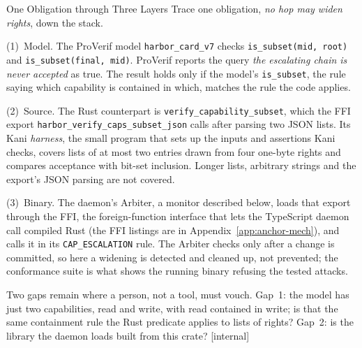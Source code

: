 \documentclass[11pt,a4paper]{article}
\theoremstyle{definition}
\begin{document}
\begin{pdexample}{One Obligation through Three Layers}
\setlength{\parskip}{4pt plus 1pt}
Trace one obligation, \emph{no hop may widen rights}, down the stack.

(1)~Model. The ProVerif model \texttt{harbor\_card\_v7} checks
\texttt{is\_subset(mid, root)} and \texttt{is\_subset(final, mid)}. ProVerif
reports the query \emph{the escalating chain is never accepted} as true. The
result holds only if the model's \texttt{is\_subset}, the rule saying which
capability is contained in which, matches the rule the code applies.

(2)~Source. The Rust counterpart is \texttt{verify\_capability\_subset}, which
the FFI export \texttt{harbor\_verify\_caps\_subset\_json} calls after parsing
two JSON lists. Its Kani \emph{harness}, the small program that sets up the
inputs and assertions Kani checks, covers lists of at most two entries drawn
from four one-byte rights and compares acceptance with bit-set inclusion.
Longer lists, arbitrary strings and the export's JSON parsing are not covered.

(3)~Binary. The daemon's Arbiter, a monitor described below, loads that
export through the FFI, the foreign-function interface that lets the
TypeScript daemon call compiled Rust (the FFI listings are in
Appendix~\ref{app:anchor-mech}), and calls it in its \texttt{CAP\_ESCALATION}
rule. The Arbiter checks only after a change is committed, so here a widening
is detected and cleaned up, not prevented; the conformance suite is what shows
the running binary refusing the tested attacks.

Two gaps remain where a person, not a tool, must vouch. Gap~1: the model has
just two capabilities, read and write, with read contained in write; is that
the same containment rule the Rust predicate applies to lists of rights? Gap~2: is the library
the daemon loads built from this crate? [internal]
\end{pdexample}

\ifdefined\pdbookfontprofile
\fi
\end{document}
